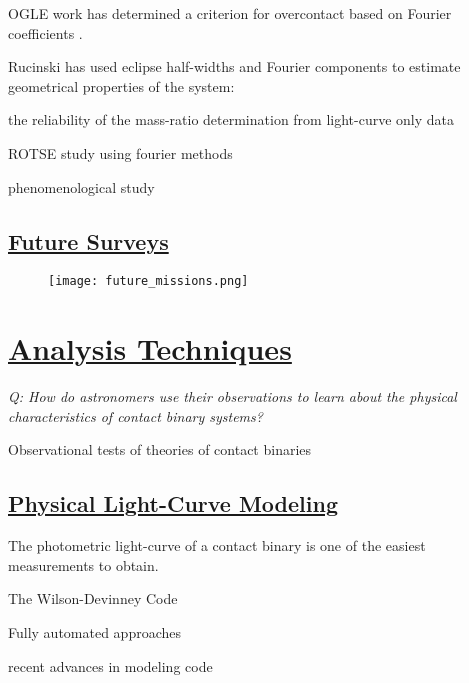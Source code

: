 \documentclass[12pt]{article} %
\numberwithin{equation}{section} %
\begin{document}
OGLE work has determined a criterion for overcontact based on Fourier coefficients \citep{rucinski1997eclipsing}. \citep{rucinski1993simple}

Rucinski has used eclipse half-widths and Fourier components to estimate geometrical properties of the system:

\citep{rucinski1973w}

the reliability of the mass-ratio determination from light-curve only data \citep{hambalek2013reliability}

ROTSE study using fourier methods \citep{coker2013study}

phenomenological study \citep{andronov2012phenomenological}

\subsection[Future Surveys]{\hyperlink{toc}{Future Surveys}}

\begin{figure}[H]
\centering
\texttt{[image: future\_missions.png]}
\caption{}
\label{fig: future_missions}
\end{figure}



\section[Analysis Techniques]{\hyperlink{toc}{Analysis Techniques}} \label{sec: analysis_techniques}

\emph{Q: How do astronomers use their observations to learn about the physical characteristics of contact binary systems?}

Observational tests of theories of contact binaries \citet{lucy1979observational}

\subsection[Physical Light-Curve Modeling]{\hyperlink{toc}{Physical Light-Curve Modeling}} \label{sec: Physical Light-Curve Modeling}

The photometric light-curve of a contact binary is one of the easiest measurements to obtain.

The Wilson-Devinney Code 

Fully automated approaches \citep{prsa2009fully} \citep{prsa2008artificial}

recent advances in modeling code \citep{prvsa2013physics}
\end{document}
